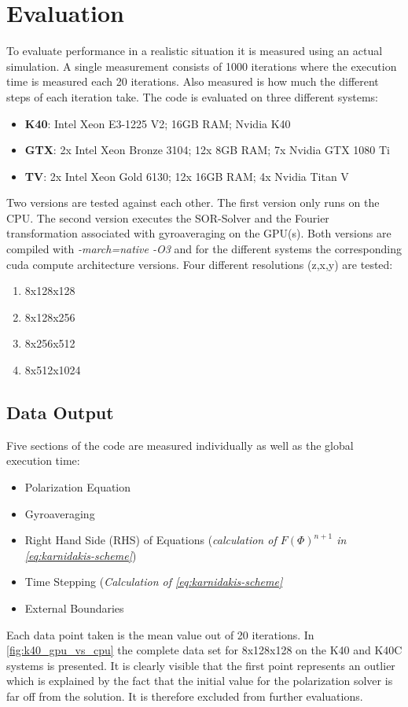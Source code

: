 \documentclass[master.tex]{subfiles}
\begin{document}
\section{Evaluation}
To evaluate performance in a realistic situation it is measured using an actual simulation. A single measurement consists of 1000 iterations where the execution time is measured each 20 iterations. Also measured is how much the different steps of each iteration take.\newline
The code is evaluated on three different systems:
\begin{itemize}
    \item \textbf{\ac{K40}}: Intel Xeon E3-1225 V2; 16GB RAM; Nvidia K40
    \item \textbf{\ac{GTX}}: 2x Intel Xeon Bronze 3104; 12x 8GB RAM; 7x Nvidia GTX 1080 Ti
    \item \textbf{\ac{TV}}: 2x Intel Xeon Gold 6130; 12x 16GB RAM; 4x Nvidia Titan V
\end{itemize}
Two versions are tested against each other. The first version only runs on the CPU. The second version executes the \ac{SOR}-Solver and the Fourier transformation associated with gyroaveraging on the GPU(s). Both versions are compiled with \textit{-march=native -O3} and for the different systems the corresponding cuda compute architecture versions. Four different resolutions (z,x,y) are tested:
\begin{enumerate}
    \item 8x128x128
    \item 8x128x256
    \item 8x256x512
    \item 8x512x1024
\end{enumerate}

\subsection{Data Output}
Five sections of the code are measured individually as well as the global execution time:
\begin{itemize}
    \item Polarization Equation
    \item Gyroaveraging
    \item Right Hand Side (RHS) of Equations (\textit{calculation of $F(\Phi)^{n+1}$ in \autoref{eq:karnidakis-scheme}})
    \item Time Stepping (\textit{Calculation of \autoref{eq:karnidakis-scheme}}
    \item External Boundaries
\end{itemize}
Each data point taken is the mean value out of 20 iterations. In \autoref{fig:k40_gpu_vs_cpu} the complete data set for 8x128x128 on the \ac{K40} and \ac{K40C} systems is presented. It is clearly visible that the first point represents an outlier which is explained by the fact that the initial value for the polarization solver is far off from the solution. It is therefore excluded from further evaluations. 
\end{document}
